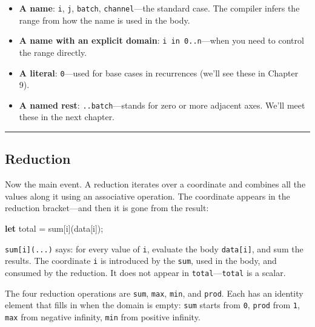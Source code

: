 \documentclass[11pt,]{article}
\newenvironment{Shaded}{}{}
\newcommand{\KeywordTok}[1]{\textcolor[rgb]{0.00,0.44,0.13}{\textbf{#1}}}
\newcommand{\NormalTok}[1]{#1}
\newcommand{\OperatorTok}[1]{\textcolor[rgb]{0.40,0.40,0.40}{#1}}
\providecommand{\tightlist}{%
  \setlength{\itemsep}{0pt}\setlength{\parskip}{0pt}}
\begin{document}
\begin{itemize}
\tightlist
\item
  \textbf{A name}: \texttt{i}, \texttt{j}, \texttt{batch},
  \texttt{channel}---the standard case. The compiler infers the range
  from how the name is used in the body.
\item
  \textbf{A name with an explicit domain}: \texttt{i\ in\ 0..n}---when
  you need to control the range directly.
\item
  \textbf{A literal}: \texttt{0}---used for base cases in recurrences
  (we'll see these in Chapter 9).
\item
  \textbf{A named rest}: \texttt{..batch}---stands for zero or more
  adjacent axes. We'll meet these in the next chapter.
\end{itemize}

\begin{center}\rule{0.5\linewidth}{0.4pt}\end{center}

\hypertarget{reduction}{%
\subsection{Reduction}\label{reduction}}

Now the main event. A reduction iterates over a coordinate and combines
all the values along it using an associative operation. The coordinate
appears in the reduction bracket---and then it is gone from the result:

\begin{Shaded}
\begin{Highlighting}[]
\KeywordTok{let}\NormalTok{ total = sum}\OperatorTok{[}\NormalTok{i}\OperatorTok{]}\NormalTok{(data}\OperatorTok{[}\NormalTok{i}\OperatorTok{]}\NormalTok{);}
\end{Highlighting}
\end{Shaded}

\texttt{sum{[}i{]}(...)} says: for every value of \texttt{i}, evaluate
the body \texttt{data{[}i{]}}, and sum the results. The coordinate
\texttt{i} is introduced by the \texttt{sum}, used in the body, and
consumed by the reduction. It does not appear in
\texttt{total}---\texttt{total} is a scalar.

The four reduction operations are \texttt{sum}, \texttt{max},
\texttt{min}, and \texttt{prod}. Each has an identity element that fills
in when the domain is empty: \texttt{sum} starts from \texttt{0},
\texttt{prod} from \texttt{1}, \texttt{max} from negative infinity,
\texttt{min} from positive infinity.
\end{document}
